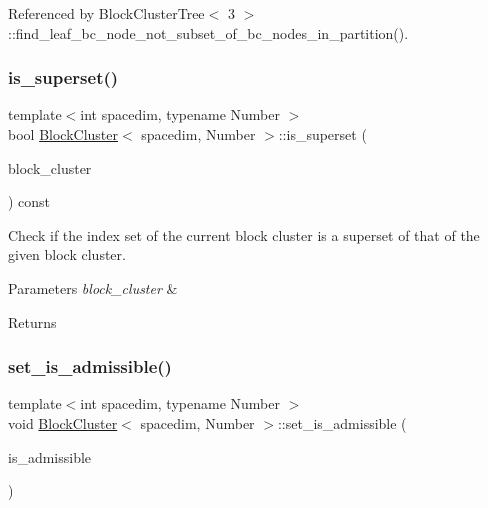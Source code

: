 Referenced by Block\+Cluster\+Tree$<$ 3 $>$\+::find\+\_\+leaf\+\_\+bc\+\_\+node\+\_\+not\+\_\+subset\+\_\+of\+\_\+bc\+\_\+nodes\+\_\+in\+\_\+partition().

\mbox{\label{classBlockCluster_a445fc9afc9a246f7d3832c9c96c16d21}} 
\subsubsection{\texorpdfstring{is\+\_\+superset()}{is\_superset()}}
{\footnotesize\ttfamily template$<$int spacedim, typename Number $>$ \\
bool \hyperlink{classBlockCluster}{Block\+Cluster}$<$ spacedim, Number $>$\+::is\+\_\+superset (\begin{DoxyParamCaption}\item[{const \hyperlink{classBlockCluster}{Block\+Cluster}$<$ spacedim, Number $>$ \&}]{block\+\_\+cluster }\end{DoxyParamCaption}) const}

Check if the index set of the current block cluster is a superset of that of the given block cluster. 
\begin{DoxyParams}{Parameters}
{\em block\+\_\+cluster} & \\
\hline
\end{DoxyParams}
\begin{DoxyReturn}{Returns}

\end{DoxyReturn}
\mbox{\label{classBlockCluster_a598050ab9a4340c3cd02f678788f5bb0}} 
\subsubsection{\texorpdfstring{set\+\_\+is\+\_\+admissible()}{set\_is\_admissible()}}
{\footnotesize\ttfamily template$<$int spacedim, typename Number $>$ \\
void \hyperlink{classBlockCluster}{Block\+Cluster}$<$ spacedim, Number $>$\+::set\+\_\+is\+\_\+admissible (\begin{DoxyParamCaption}\item[{const bool}]{is\+\_\+admissible }\end{DoxyParamCaption})}

